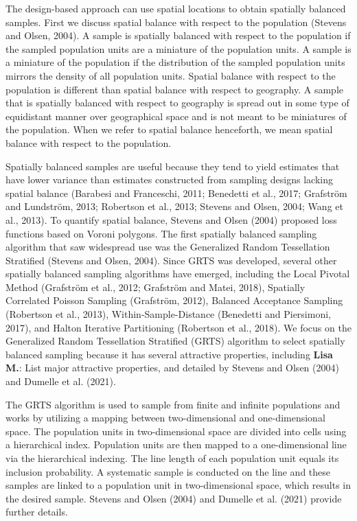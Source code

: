 \documentclass[]{elsarticle} %
\begin{document}
The design-based approach can use spatial locations to obtain spatially
balanced samples. First we discuss spatial balance with respect to the
population (Stevens and Olsen, 2004). A sample is spatially balanced
with respect to the population if the sampled population units are a
miniature of the population units. A sample is a miniature of the
population if the distribution of the sampled population units mirrors
the density of all population units. Spatial balance with respect to the
population is different than spatial balance with respect to geography.
A sample that is spatially balanced with respect to geography is spread
out in some type of equidistant manner over geographical space and is
not meant to be miniatures of the population. When we refer to spatial
balance henceforth, we mean spatial balance with respect to the
population.

Spatially balanced samples are useful because they tend to yield
estimates that have lower variance than estimates constructed from
sampling designs lacking spatial balance (Barabesi and Franceschi, 2011;
Benedetti et al., 2017; Grafström and Lundström, 2013; Robertson et al.,
2013; Stevens and Olsen, 2004; Wang et al., 2013). To quantify spatial
balance, Stevens and Olsen (2004) proposed loss functions based on
Voroni polygons. The first spatially balanced sampling algorithm that
saw widespread use was the Generalized Random Tessellation Stratified
(Stevens and Olsen, 2004). Since GRTS was developed, several other
spatially balanced sampling algorithms have emerged, including the Local
Pivotal Method (Grafström et al., 2012; Grafström and Matei, 2018),
Spatially Correlated Poisson Sampling (Grafström, 2012), Balanced
Acceptance Sampling (Robertson et al., 2013), Within-Sample-Distance
(Benedetti and Piersimoni, 2017), and Halton Iterative Partitioning
(Robertson et al., 2018). We focus on the Generalized Random
Tessellation Stratified (GRTS) algorithm to select spatially balanced
sampling because it has several attractive properties, including
\textbf{Lisa M.}: List major attractive properties, and detailed by
Stevens and Olsen (2004) and Dumelle et al. (2021).

The GRTS algorithm is used to sample from finite and infinite
populations and works by utilizing a mapping between two-dimensional and
one-dimensional space. The population units in two-dimensional space are
divided into cells using a hierarchical index. Population units are then
mapped to a one-dimensional line via the hierarchical indexing. The line
length of each population unit equals its inclusion probability. A
systematic sample is conducted on the line and these samples are linked
to a population unit in two-dimensional space, which results in the
desired sample. Stevens and Olsen (2004) and Dumelle et al. (2021)
provide further details.
\end{document}
